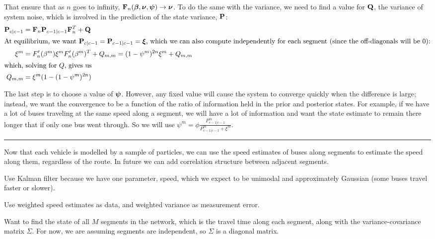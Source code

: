 \documentclass[draftcls,a4paper,onecolumn]{IEEEtran}\usepackage[]{graphicx}\usepackage[]{color}
\begin{document}
That ensure that as $n$ goes to infinity, $\mathbf{F}_n(\boldsymbol{\beta}, \boldsymbol{\nu}, \boldsymbol{\psi}) \to \boldsymbol{\nu}$.
To do the same with the variance, we need to find a value for $\mathbf{Q}$,
the variance of system noise, which is involved in the prediction of the state variance, $\mathbf{P}$:
\begin{align}
  \label{eq:kf_varpred}
  \mathbf{P}_{c|c-1} &= \mathbf{F}_n \mathbf{P}_{c-1|c-1}\mathbf{F}_n^T + \mathbf{Q} \nonumber \\
  \intertext{At equilibrium, we want $\mathbf{P}_{c|c-1} = \mathbf{P}_{c-1|c-1} = \boldsymbol{\xi}$,
  which we can also compute independently for each segment (since the off-diagonals will be 0):}
  \xi^m &= F'_n(\beta^m) \xi^m F'_n(\beta^m)^T + Q_{m,m} = (1-\psi^m)^{2n} \xi^m + Q_{m,m} \nonumber \\
  \intertext{which, solving for $Q$, gives us}
  Q_{m,m} &= \xi^m(1 - (1 - \psi^m)^{2n})
\end{align}

The last step is to choose a value of $\boldsymbol{\psi}$.
However, any fixed value will cause the system to converge quickly when the difference is large;
instead, we want the convergence to be a function of the ratio of information held
in the prior and posterior states. 
For example, if we have a lot of buses traveling at the same speed along a segment, 
we will have a lot of information and want the state estimate to remain there
longer that if only one bus went through. 
So we will use $\psi^m = \phi \frac{P^m_{c-1|c-1}}{P^m_{c-1|c-1} + \xi^m}$.



\vspace{2em}
\hrule
Now that each vehicle is modelled by a sample of particles,
we can use the speed estimates of buses along segments to estimate
the speed along them, regardless of the route.
In future we can add correlation structure between adjacent segments.

Use Kalman filter because we have one parameter, speed, 
which we expect to be unimodal and approximately Gaussian
(some buses travel faster or slower).

Use weighted speed estimates as data,
and weighted variance as measurement error.

Want to find the state of all $M$ segments in the network,
which is the travel time along each segment,
along with the variance-covariance matrix $\Sigma$.
For now, we are assuming segments are independent,
so $\Sigma$ is a diagonal matrix.
\end{document}
